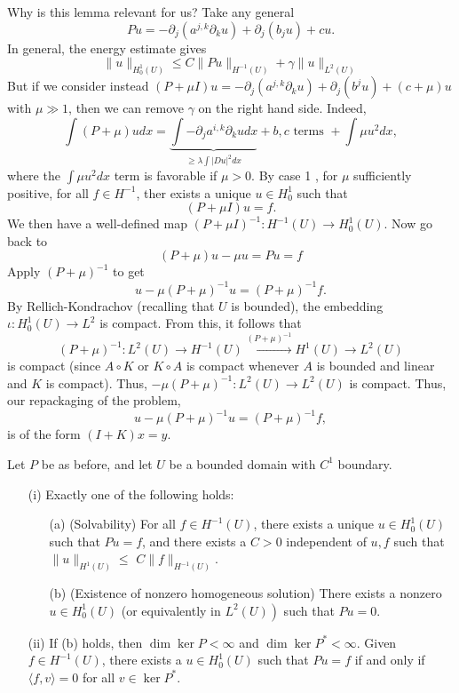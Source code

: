 Why is this lemma relevant for us? Take any general
$$
P u=-\partial_{j}\left(a^{j, k} \partial_{k} u\right)+\partial_j(b_j u)+c u .
$$
In general, the energy estimate gives
$$
\|u\|_{H_{0}^{1}(U)} \leq C\|P u\|_{H^{-1}(U)}+\gamma\|u\|_{L^{2}(U)}
$$
But if we consider instead $(P+\mu I) u=-\partial_{j}\left(a^{j, k} \partial_{k} u\right)+\partial_j(b^{j} u)+(c+\mu) u$ with $\mu \gg 1$, then we can remove $\gamma$ on the right hand side.
Indeed,
$$
\int(P+\mu) u d x=\underbrace{\int-\partial_{j} a^{i, k} \partial_{k} u d x}_{\geq \lambda \int|D u|^{2} d x}+b, c \text { terms }+\int \mu u^{2} d x,
$$
where the $\int \mu u^{2} d x$ term is favorable if $\mu>0$. By case 1 , for $\mu$ sufficiently positive, for all $f \in H^{-1}$, ther exists a unique $u \in H_{0}^{1}$ such that
$$
(P+\mu I) u=f .
$$
We then have a well-defined map $(P+\mu I)^{-1}: H^{-1}(U) \rightarrow H_{0}^{1}(U)$. Now go back to
$$
(P+\mu) u-\mu u=P u=f
$$
Apply $(P+\mu)^{-1}$ to get
$$
u-\mu(P+\mu)^{-1} u=(P+\mu)^{-1} f .
$$
By Rellich-Kondrachov (recalling that $U$ is bounded), the embedding $\iota: H_{0}^{1}(U) \rightarrow L^{2}$ is compact. From this, it follows that
$$
(P+\mu)^{-1}: L^{2}(U) \rightarrow H^{-1}(U) \stackrel{(P+\mu)^{-1}}{\longrightarrow} H^{1}(U) \rightarrow L^{2}(U)
$$
is compact (since $A \circ K$ or $K \circ A$ is compact whenever $A$ is bounded and linear and $K$ is compact). Thus, $-\mu(P+\mu)^{-1}: L^{2}(U) \rightarrow L^{2}(U)$ is compact. Thus, our repackaging of the problem,
$$
u-\mu(P+\mu)^{-1} u=(P+\mu)^{-1} f,
$$
is of the form $(I+K) x=y$.

\begin{theorem}
\label{thm: Fredholm alternative}
Let $P$ be as before, and let $U$ be a bounded domain with $C^{1}$ boundary.
\begin{itemize}
    \item[(i)] Exactly one of the following holds: 
    \begin{itemize}
        \item[(a)] (Solvability) For all $f \in H^{-1}(U)$, there exists a unique $u \in H_{0}^{1}(U)$ such that $P u=f$, and there exists a $C>0$ independent of $u, f$ such that $\|u\|_{H^{1}(U)} \leq$ $C\|f\|_{H^{-1}(U)}$.
        \item[(b)] (Existence of nonzero homogeneous solution) There exists a nonzero $u \in H_{0}^{1}(U)$ (or equivalently in $\left.L^{2}(U)\right)$ such that $P u=0$.
    \end{itemize}
    \item[(ii)] If (b) holds, then $\operatorname{dim} \operatorname{ker} P<\infty$ and $\operatorname{dim} \operatorname{ker} P^{*}<\infty$. Given $f \in H^{-1}(U)$, there exists a $u \in H_{0}^{1}(U)$ such that $P u=f$ if and only if $\langle f, v\rangle=0$ for all $v \in \operatorname{ker} P^{*}$.
\end{itemize}
\end{theorem}

